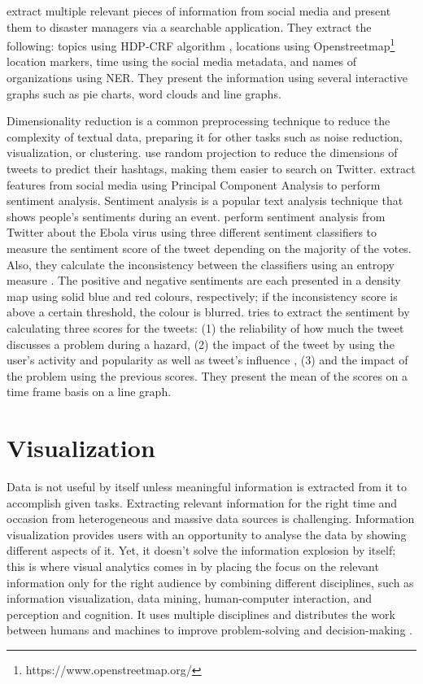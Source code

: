  extract multiple relevant pieces of information from
social media and present them to disaster managers via a searchable application. They extract the
following: topics using HDP-CRF algorithm \cite{tehHierarchicalBayesianNonparametric2010}, locations
using Openstreetmap\footnote{https://www.openstreetmap.org/} location markers, time using the social
media metadata, and names of organizations using \ac{NER}. They present the information using
several interactive graphs such as pie charts, word clouds and line graphs.

Dimensionality reduction is a common preprocessing technique to reduce the complexity of textual
data, preparing it for other tasks such as noise reduction, visualization, or clustering.
 use random projection to reduce the
dimensions of tweets to predict their hashtags, making them easier to search on Twitter.
 extract features from social media using Principal
Component Analysis to perform sentiment analysis. Sentiment analysis is a popular text analysis
technique that shows people's sentiments during an event. 
perform sentiment analysis from Twitter about the Ebola virus using three different sentiment
classifiers to measure the sentiment score of the tweet depending on the majority of the votes.
Also, they calculate the inconsistency between the classifiers using an entropy measure
\cite{argamon-engelsonCommitteeBasedSampleSelection1999}. The positive and negative sentiments are
each presented in a density map using solid blue and red colours, respectively; if the inconsistency
score is above a certain threshold, the colour is blurred.
 tries to extract the sentiment by calculating
three scores for the tweets: (1) the reliability of how much the tweet discusses a problem during a
hazard, (2) the impact of the tweet by using the user's activity and popularity as well as tweet's
influence \cite{palIdentifyingTopicalAuthorities2011}, (3) and the impact of the
problem using the previous scores. They present the mean of the scores on a time frame basis on a
line graph.

\section{Visualization}
Data is not useful by itself unless meaningful information is extracted from it to accomplish
given tasks. Extracting relevant information for the right time and occasion from heterogeneous
and massive data sources is challenging. Information visualization provides users with an
opportunity to analyse the data by showing different aspects of it. Yet, it doesn't solve the
information explosion by itself; this is where visual analytics comes in by placing the focus on
the relevant information only for the right audience by combining different disciplines, such as
information visualization, data mining, human-computer interaction, and perception and
cognition. It uses multiple disciplines and distributes the work between humans and machines to
improve problem-solving and decision-making \cite{keimVisualAnalyticsDefinition2008}.

